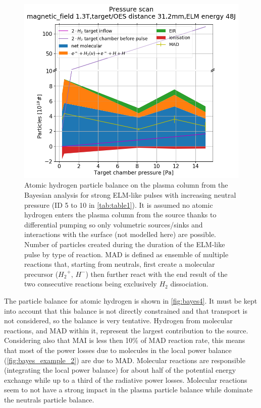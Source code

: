 \begin{figure}[!ht]
        \centering
    	\includegraphics[width=0.7\linewidth,trim={35 5 60 50},clip]{Chapters/chapter3/figs/Bayesian_strong_7.png}
	\caption{Atomic hydrogen particle balance on the plasma column from the Bayesian analysis for strong ELM-like pulses with increasing neutral pressure (ID 5 to 10 in \autoref{tab:table1}). It is assumed no atomic hydrogen enters the plasma column from the source thanks to differential pumping so only volumetric sources/sinks and interactions with the surface (not modelled here) are possible. Number of particles created during the duration of the ELM-like pulse by type of reaction. MAD is defined as ensemble of multiple reactions that, starting from neutrals, first create a molecular precursor (${H_2}^+$, $H^-$) then further react with the end result of the two consecutive reactions being exclusively $H_2$ dissociation.\cite{Verhaegh2020}}
	\label{fig:bayes4}
\end{figure}

The particle balance for atomic hydrogen is shown in \autoref{fig:bayes4}. It must be kept into account that this balance is not directly constrained and that transport is not considered, so the balance is very tentative. Hydrogen from molecular reactions, and MAD within it, represent the largest contribution to the source. Considering also that MAI is less then 10\% of MAD reaction rate, this means that most of the power losses due to molecules in the local power balance (\autoref{fig:bayes_example_2}) are due to MAD. Molecular reactions are responsible (integrating the local power balance) for about half of the potential energy exchange while up to a third of the radiative power losses. Molecular reactions seem to not have a strong impact in the plasma particle balance while dominate the neutrals particle balance.

